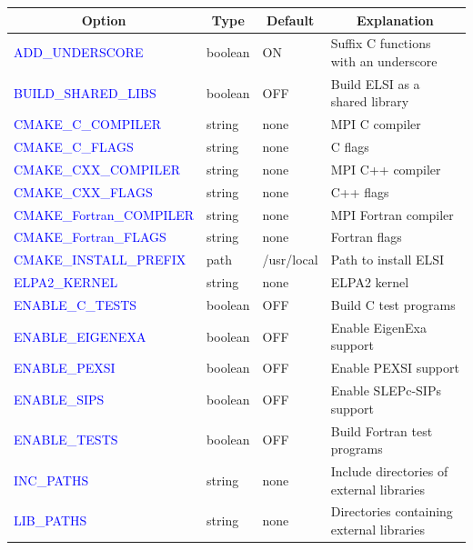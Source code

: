 \documentclass{report}
\begin{document}
\begin{tabular}[]{|p{50mm}|p{15mm}|p{20mm}|p{80mm}|}
\hline
\multicolumn{1}{|c|}{\textbf{Option}} & \multicolumn{1}{c|}{\textbf{Type}} & \multicolumn{1}{c|}{\textbf{Default}} & \multicolumn{1}{c|}{\textbf{Explanation}}\\
\hline
\textcolor{blue}{ADD\_UNDERSCORE}          & boolean & ON          & Suffix C functions with an underscore\\
\hline
\textcolor{blue}{BUILD\_SHARED\_LIBS}      & boolean & OFF         & Build ELSI as a shared library\\
\hline
\textcolor{blue}{CMAKE\_C\_COMPILER}       & string  & none        & MPI C compiler\\
\hline
\textcolor{blue}{CMAKE\_C\_FLAGS}          & string  & none        & C flags\\
\hline
\textcolor{blue}{CMAKE\_CXX\_COMPILER}     & string  & none        & MPI C++ compiler\\
\hline
\textcolor{blue}{CMAKE\_CXX\_FLAGS}        & string  & none        & C++ flags\\
\hline
\textcolor{blue}{CMAKE\_Fortran\_COMPILER} & string  & none        & MPI Fortran compiler\\
\hline
\textcolor{blue}{CMAKE\_Fortran\_FLAGS}    & string  & none        & Fortran flags\\
\hline
\textcolor{blue}{CMAKE\_INSTALL\_PREFIX}   & path    & /usr/local  & Path to install ELSI\\
\hline
\textcolor{blue}{ELPA2\_KERNEL}            & string  & none        & ELPA2 kernel\\
\hline
\textcolor{blue}{ENABLE\_C\_TESTS}         & boolean & OFF         & Build C test programs\\
\hline
\textcolor{blue}{ENABLE\_EIGENEXA}         & boolean & OFF         & Enable EigenExa support\\
\hline
\textcolor{blue}{ENABLE\_PEXSI}            & boolean & OFF         & Enable PEXSI support\\
\hline
\textcolor{blue}{ENABLE\_SIPS}             & boolean & OFF         & Enable SLEPc-SIPs support\\
\hline
\textcolor{blue}{ENABLE\_TESTS}            & boolean & OFF         & Build Fortran test programs\\
\hline
\textcolor{blue}{INC\_PATHS}               & string  & none        & Include directories of external libraries\\
\hline
\textcolor{blue}{LIB\_PATHS}               & string  & none        & Directories containing external libraries\\

\end{tabular}
\end{document}
